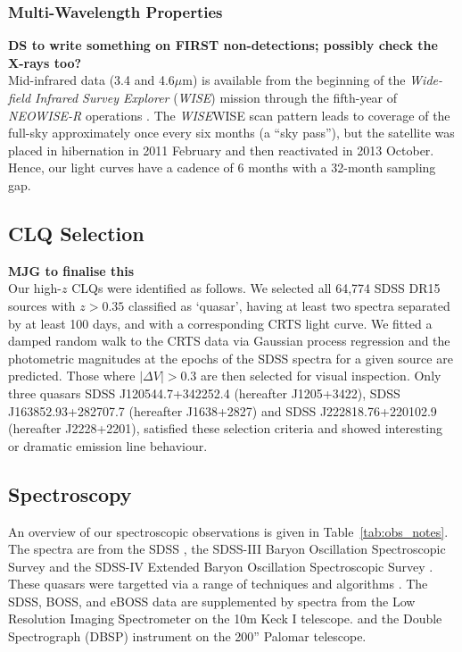 \documentclass[fleqn,usenatbib]{mnras}
\begin{document}
\subsubsection{Multi-Wavelength Properties}
{\bf DS to write something on FIRST non-detections; possibly check the X-rays too?} \\
Mid-infrared data (3.4 and 4.6$\mu$m) is available from the beginning
of the {\it Wide-field Infrared Survey Explorer} ({\it WISE}) mission
\citep[2010 January; ][]{Wright2010} through the fifth-year of {\it
NEOWISE-R} operations \citep[2018 December; ][]{Mainzer2011}. The {\it
WISE}WISE scan pattern leads to coverage of the full-sky approximately
once every six months (a ``sky pass''), but the satellite was placed
in hibernation in 2011 February and then reactivated in 2013
October. Hence, our light curves have a cadence of 6 months with a
32-month sampling gap.


\subsection{CLQ Selection}
{\bf MJG to finalise this} \\
Our high-$z$ CLQs were identified as follows.  We selected all 64,774
SDSS DR15 sources with $z > 0.35$ classified as `quasar', having at least
two spectra separated by at least 100 days, and with a corresponding
CRTS light curve. We fitted a damped random walk to the CRTS data via
Gaussian process regression and the photometric magnitudes at the
epochs of the SDSS spectra for a given source are predicted. Those
where $|\Delta V| > 0.3$ are then selected for visual
inspection. Only three quasars SDSS J120544.7+342252.4 (hereafter
J1205+3422), SDSS J163852.93+282707.7 (hereafter J1638+2827) and SDSS
J222818.76+220102.9 (hereafter J2228+2201), satisfied these selection
criteria and showed interesting or dramatic emission line behaviour.





\subsection{Spectroscopy}
An overview of our spectroscopic observations is given in
Table~\ref{tab:obs_notes}.  The spectra are from the SDSS
\citep{Stoughton2002, DR7, Schneider2010}, the SDSS-III Baryon
Oscillation Spectroscopic Survey \citep[BOSS; ][]{Eisenstein2011,
Dawson2013, Smee2013, Alam2015, Paris2017} and the SDSS-IV Extended
Baryon Oscillation Spectroscopic Survey \citep[eBOSS; ][]{Dawson2016,
Abolfathi2018, Paris2018}.  These quasars were targetted via a range
of techniques and algorithms \citep[see ][]{Richards2002, Ross2012,
Myers2015}. The SDSS, BOSS, and eBOSS data are supplemented by spectra
from the Low Resolution Imaging Spectrometer \citep[LRIS; ][]{Oke1995}
on the 10m Keck {\sc I} telescope.  and the Double Spectrograph (DBSP)
instrument on the 200'' Palomar telescope.
\end{document}
